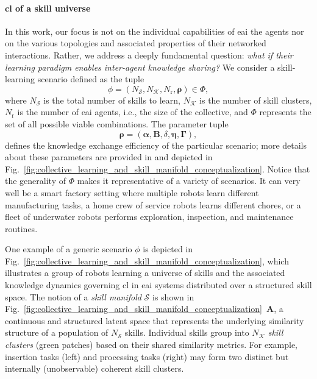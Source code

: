 \documentclass[12pt]{article}
\renewcommand{\emph}[1]{\textit{#1}}
\begin{document}
\paragraph*{\Acl{cl} of a skill universe}
In this work, our focus is not on the individual capabilities of \ac{eai} the agents nor on the various topologies and associated properties of their networked interactions. Rather, we address a deeply fundamental question: \emph{what if their learning paradigm enables inter-agent knowledge sharing?} We consider a skill-learning scenario defined as the tuple
\begin{equation*}
	\phi = \left(N_\mathcal{S}, N_\mathcal{K}, N_\mathrm{r}, \bm{\rho} \right) \in \Phi,
\end{equation*}
where $N_\mathcal{S}$ is the total number of skills to learn, $N_\mathcal{K}$ is the number of skill clusters, $N_\mathrm{r}$ is the number of \ac{eai} agents, i.e., the size of the collective, and $\Phi$ represents the set of all possible viable combinations. The parameter tuple
\begin{equation*}
	\bm{\rho} = \left(\bm{\alpha}, \bm{B}, \delta, \bm{\eta},\bm{\Gamma}\right),
\end{equation*}
defines the knowledge exchange efficiency of the particular scenario; more details about these parameters are provided in  and depicted in Fig.~\ref{fig:collective_learning_and_skill_manifold_conceptualization}. Notice that the generality of $\Phi$ makes it representative of a variety of scenarios. It can very well be a smart factory setting where multiple robots learn different manufacturing tasks, a home crew of service robots learns different chores, or a fleet of underwater robots performs exploration, inspection, and maintenance routines.

One example of a generic scenario $\phi$ is depicted in Fig.~\ref{fig:collective_learning_and_skill_manifold_conceptualization}, which illustrates a group of robots learning a universe of skills and the associated knowledge dynamics governing \ac{cl} in \ac{eai} systems distributed over a structured skill space. The notion of a \textit{skill manifold} $\mathcal{S}$ is shown in Fig.~\ref{fig:collective_learning_and_skill_manifold_conceptualization}~\textbf{A}, a continuous and structured latent space that represents the underlying similarity structure of a population of $N_\mathcal{S}$ skills. Individual skills group into $N_\mathcal{K}$ \emph{skill clusters} (green patches) based on their shared similarity metrics. For example, insertion tasks (left) and processing tasks (right) may form two distinct but internally (unobservable) coherent skill clusters.
 
\end{document}
